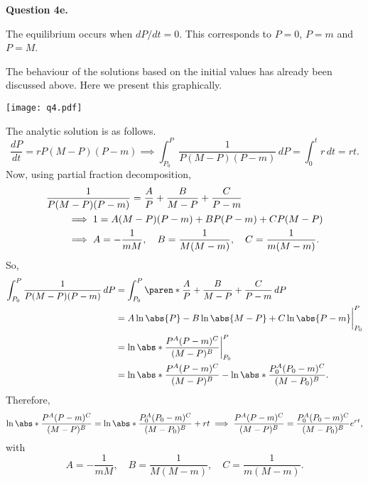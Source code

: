 \documentclass[11pt]{penrose}
\newenvironment{problem}[2][Question]{\textbf{#1 #2.}\par}{}
\begin{document}
\begin{problem}{4e}
    The equilibrium occurs when $dP/dt = 0$. This corresponds to $P = 0$, $P = m$ and $P = M$.

    The behaviour of the solutions based on the initial values has already been discussed above. Here we present this graphically.
    \begin{center}
        \texttt{[image: q4.pdf]}
    \end{center}

    The analytic solution is as follows.
    \begin{equation*}
        \frac{dP}{dt} = rP(M-P)(P-m)
        \implies
        \int_{P_{0}}^{P} \frac{1}{P(M-P)(P-m)} \,dP = \int_{0}^{t} r \,dt = rt.
    \end{equation*}
    Now, using partial fraction decomposition,
    \begin{align*}
        \MoveEqLeft
        \frac{1}{P(M-P)(P-m)} = \frac{A}{P} + \frac{B}{M - P} + \frac{C}{P - m}\\
        &\implies 1 = A(M - P)(P - m) + BP(P - m) + CP(M - P)\\
        &\implies A = - \frac{1}{mM}, \quad B = \frac{1}{M(M-m)}, \quad C = \frac{1}{m(M-m)}.
    \end{align*}
    So,
    \begin{align*}
        \int_{P_{0}}^{P} \frac{1}{P(M-P)(P-m)} \,dP
        &= \int_{P_{0}}^{P} \paren*{ \frac{A}{P} + \frac{B}{M - P} + \frac{C}{P - m} } \,dP\\
        &= A\ln\abs{P} - B\ln\abs{M-P} + C\ln\abs{P-m} \at[\bigg]{P_{0}}^{P}\\
        &= \ln\abs*{ \frac{P^{A}(P-m)^{C}}{(M-P)^{B}} } \at[\bigg]{P_{0}}^{P}\\
        &= \ln\abs*{ \frac{P^{A}(P-m)^{C}}{(M-P)^{B}} } - \ln\abs*{ \frac{P_{0}^{A}(P_{0}-m)^{C}}{(M-P_{0})^{B}} }.
    \end{align*}
    Therefore,
    \begin{align*}
        \ln\abs*{ \frac{P^{A}(P-m)^{C}}{(M-P)^{B}} } = \ln\abs*{ \frac{P_{0}^{A}(P_{0}-m)^{C}}{(M-P_{0})^{B}} } + rt
        \implies
        \frac{P^{A}(P-m)^{C}}{(M-P)^{B}} = \frac{P_{0}^{A}(P_{0}-m)^{C}}{(M-P_{0})^{B}} e^{rt},
    \end{align*}
    with
    \begin{equation*}
        A = - \frac{1}{mM}, \quad B = \frac{1}{M(M-m)}, \quad C = \frac{1}{m(M-m)}.
    \end{equation*}
\end{problem}
\end{document}

